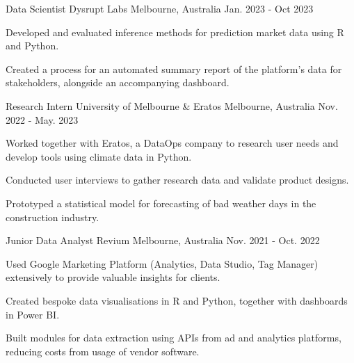 \begin{cventries}
\cventry
    {Data Scientist} %
    {Dysrupt Labs} %
    {Melbourne, Australia} %
    {Jan. 2023 - Oct 2023} %
    {
      \begin{cvitems} %
        \item Developed and evaluated inference methods for prediction market data using R and Python.
        \item Created a process for an automated summary report of the platform's data for stakeholders, alongside an accompanying dashboard.
      \end{cvitems}
    }

\cventry
    {Research Intern} %
    {University of Melbourne \& Eratos} %
    {Melbourne, Australia} %
    {Nov. 2022 - May. 2023} %
    {
      \begin{cvitems} %
        \item Worked together with Eratos, a DataOps company to research user needs and develop tools using climate data in Python.
        \item Conducted user interviews to gather research data and validate product designs.
        \item Prototyped a statistical model for forecasting of bad weather days in the construction industry.
      \end{cvitems}
    }

\cventry
    {Junior Data Analyst} %
    {Revium} %
    {Melbourne, Australia} %
    {Nov. 2021 - Oct. 2022} %
    {
      \begin{cvitems} %
        \item Used Google Marketing Platform (Analytics, Data Studio, Tag Manager) extensively to provide valuable insights for clients.
        \item Created bespoke data visualisations in R and Python, together with dashboards in Power BI.
        \item Built modules for data extraction using APIs from ad and analytics platforms, reducing costs from usage of vendor software.
      \end{cvitems}
    }





\end{cventries}
